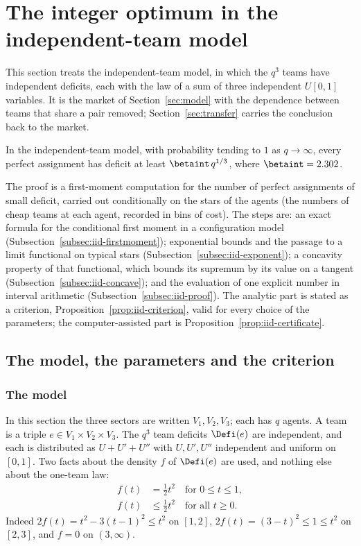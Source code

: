 \section{The integer optimum in the independent-team model}\label{sec:iid}

This section treats the independent-team model, in which the $q^3$ teams have independent
deficits, each with the law of a sum of three independent $U[0,1]$ variables. It is the
market of Section~\ref{sec:model} with the dependence between teams that share a pair
removed; Section~\ref{sec:transfer} carries the conclusion back to the market.

\begin{theorem}\label{thm:iid}
In the independent-team model, with probability tending to $1$ as $q\to\infty$, every
perfect assignment has deficit at least $\betaint\,q^{1/3}$, where $\betaint=2.302$.
\end{theorem}

The proof is a first-moment computation for the number of perfect assignments of small
deficit, carried out conditionally on the stars of the agents (the numbers of cheap teams
at each agent, recorded in bins of cost). The steps are: an exact formula for the conditional first moment in a
configuration model (Subsection~\ref{subsec:iid-firstmoment}); exponential bounds and the
passage to a limit functional on typical stars (Subsection~\ref{subsec:iid-exponent}); a
concavity property of that functional, which bounds its supremum by its value on a tangent
(Subsection~\ref{subsec:iid-concave}); and the evaluation of one explicit number in
interval arithmetic (Subsection~\ref{subsec:iid-proof}). The analytic part is stated as a
criterion, Proposition~\ref{prop:iid-criterion}, valid for every choice of the parameters;
the computer-assisted part is Proposition~\ref{prop:iid-certificate}.

\subsection{The model, the parameters and the criterion}\label{subsec:iid-model}

\subsubsection*{The model}
In this section the three sectors are written $V_1,V_2,V_3$; each has $q$ agents. A team is
a triple $e\in V_1\times V_2\times V_3$. The $q^3$ team deficits $\Defi(e)$ are
independent, and each is distributed as $U+U'+U''$ with $U,U',U''$ independent and uniform
on $[0,1]$. Two facts about the density $f$ of $\Defi(e)$ are used, and nothing else about
the one-team law:
\begin{align}
f(t)&=\tfrac12 t^2\quad\text{for }0\le t\le 1, \tag{F1}\label{eq:iid-F1}\\
f(t)&\le\tfrac12 t^2\quad\text{for all }t\ge 0. \tag{F2}\label{eq:iid-F2}
\end{align}
Indeed $2f(t)=t^2-3(t-1)^2\le t^2$ on $[1,2]$, $2f(t)=(3-t)^2\le1\le t^2$ on $[2,3]$, and
$f=0$ on $(3,\infty)$.

